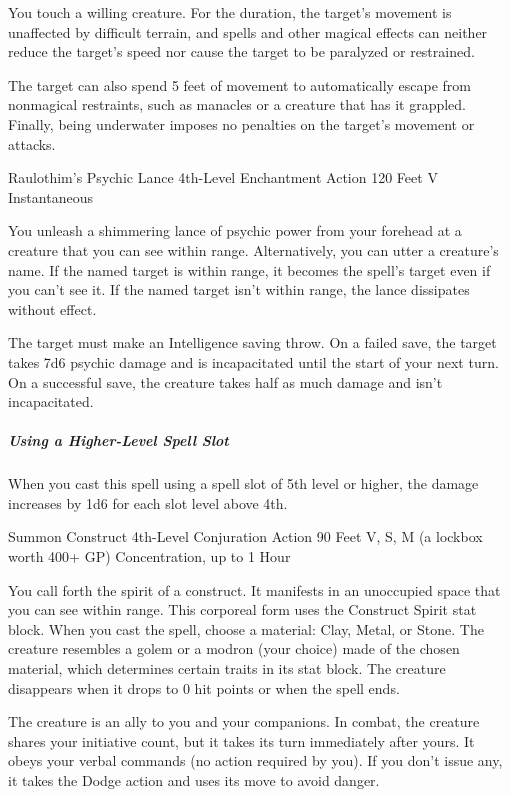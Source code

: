 \documentclass[letterpaper,openany,oneside,twocolumn]{book}
\begin{document}
You touch a willing creature. For the duration, the target's movement is unaffected by difficult terrain, and spells and other magical effects can neither reduce the target's speed nor cause the target to be paralyzed or restrained.

The target can also spend 5 feet of movement to automatically escape from nonmagical restraints, such as manacles or a creature that has it grappled. Finally, being underwater imposes no penalties on the target's movement or attacks.

\DndSpellHeader
  {Raulothim's Psychic Lance}
  {4th-Level Enchantment}
  {Action}
  {120 Feet}
  {V}
  {Instantaneous}
  
You unleash a shimmering lance of psychic power from your forehead at a creature that you can see within range. Alternatively, you can utter a creature's name. If the named target is within range, it becomes the spell's target even if you can't see it. If the named target isn't within range, the lance dissipates without effect.

The target must make an Intelligence saving throw. On a failed save, the target takes 7d6 psychic damage and is incapacitated until the start of your next turn. On a successful save, the creature takes half as much damage and isn't incapacitated.

\subparagraph*{Using a Higher-Level Spell Slot} When you cast this spell using a spell slot of 5th level or higher, the damage increases by 1d6 for each slot level above 4th.

\DndSpellHeader
  {Summon Construct}
  {4th-Level Conjuration}
  {Action}
  {90 Feet}
  {V, S, M (a lockbox worth 400+ GP)}
  {Concentration, up to 1 Hour}
  
You call forth the spirit of a construct. It manifests in an unoccupied space that you can see within range. This corporeal form uses the Construct Spirit stat block. When you cast the spell, choose a material: Clay, Metal, or Stone. The creature resembles a golem or a modron (your choice) made of the chosen material, which determines certain traits in its stat block. The creature disappears when it drops to 0 hit points or when the spell ends.

The creature is an ally to you and your companions. In combat, the creature shares your initiative count, but it takes its turn immediately after yours. It obeys your verbal commands (no action required by you). If you don't issue any, it takes the Dodge action and uses its move to avoid danger.
\end{document}
